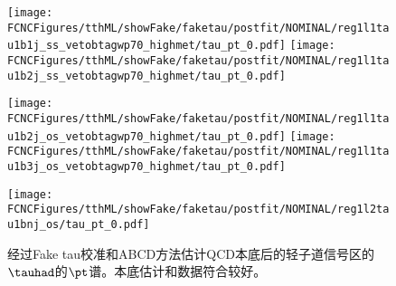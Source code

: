 \begin{figure}[H]
\centering
\texttt{[image: \\FCNCFigures/tthML/showFake/faketau/postfit/NOMINAL/reg1l1tau1b1j\_ss\_vetobtagwp70\_highmet/tau\_pt\_0.pdf]}
\texttt{[image: \\FCNCFigures/tthML/showFake/faketau/postfit/NOMINAL/reg1l1tau1b2j\_ss\_vetobtagwp70\_highmet/tau\_pt\_0.pdf]}

\texttt{[image: \\FCNCFigures/tthML/showFake/faketau/postfit/NOMINAL/reg1l1tau1b2j\_os\_vetobtagwp70\_highmet/tau\_pt\_0.pdf]}
\texttt{[image: \\FCNCFigures/tthML/showFake/faketau/postfit/NOMINAL/reg1l1tau1b3j\_os\_vetobtagwp70\_highmet/tau\_pt\_0.pdf]}

\texttt{[image: \\FCNCFigures/tthML/showFake/faketau/postfit/NOMINAL/reg1l2tau1bnj\_os/tau\_pt\_0.pdf]}

\caption{经过Fake tau校准和ABCD方法估计QCD本底后的轻子道信号区的$\tauhad$的$\pt$谱。本底估计和数据符合较好。}
\label{fig:wjet_pt_postfit}
\end{figure}
